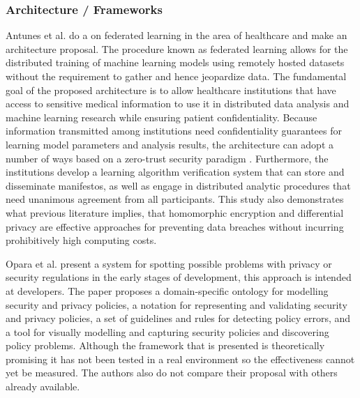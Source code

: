 \subsubsection{Architecture / Frameworks}

Antunes et al. \cite{AntunesFederated} do a \hyperlink{\acronym}{\acronym} on federated learning in
the area of healthcare and make an architecture proposal. The procedure
known as federated learning allows for the distributed training of machine
learning models using remotely hosted datasets without the requirement to
gather and hence jeopardize data. The fundamental goal of the proposed architecture is
to allow healthcare institutions that have access to sensitive medical information
to use it in distributed data analysis and machine learning research while
ensuring patient confidentiality. Because information transmitted among
institutions need confidentiality guarantees for learning model parameters
and analysis results, the architecture can adopt a number of ways based on
a zero-trust security paradigm \cite{ChenSecurity}. Furthermore, the institutions
develop a learning algorithm verification system that can store and disseminate
manifestos, as well as engage in distributed analytic procedures that need
unanimous agreement from all participants. This study also demonstrates
what previous literature implies, that homomorphic encryption and differential
privacy are effective approaches for preventing data breaches without incurring
prohibitively high computing costs.

Opara et al. \cite{opara2022framework} present a system for spotting possible
problems with privacy or security regulations in the early stages of development,
this approach is intended at developers. The paper proposes a domain-specific
ontology for modelling \hyperlink{\acronym}{\acronym} security and privacy policies, a notation for
representing and validating \hyperlink{\acronym}{\acronym} security and privacy policies, a set of
guidelines and rules for detecting \hyperlink{\acronym}{\acronym} policy errors, and a tool for visually
modelling and capturing \hyperlink{\acronym}{\acronym} security policies and discovering policy problems.
Although the framework that is presented is theoretically promising it has
not been tested in a real environment so the effectiveness cannot yet be
measured. The authors also do not compare their proposal with others already
available.


